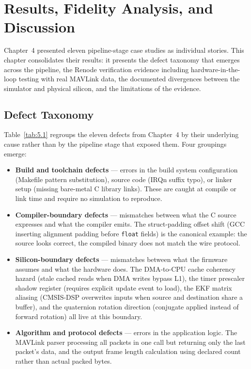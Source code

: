 \chapter{Results, Fidelity Analysis, and Discussion}
\label{ch:discussion}

Chapter~4 presented eleven pipeline-stage case studies as individual stories. This chapter consolidates their results: it presents the defect taxonomy that emerges across the pipeline, the Renode verification evidence including hardware-in-the-loop testing with real MAVLink data, the documented divergences between the simulator and physical silicon, and the limitations of the evidence.

\section{Defect Taxonomy}

Table~\ref{tab:5.1} regroups the eleven defects from Chapter~4 by their underlying cause rather than by the pipeline stage that exposed them. Four groupings emerge:

\begin{itemize}
\item \textbf{Build and toolchain defects} --- errors in the build system configuration (Makefile pattern substitution), source code (IRQn suffix typo), or linker setup (missing bare-metal C library links). These are caught at compile or link time and require no simulation to reproduce.
\item \textbf{Compiler-boundary defects} --- mismatches between what the C source expresses and what the compiler emits. The struct-padding offset shift (GCC inserting alignment padding before \texttt{float} fields) is the canonical example: the source looks correct, the compiled binary does not match the wire protocol.
\item \textbf{Silicon-boundary defects} --- mismatches between what the firmware assumes and what the hardware does. The DMA-to-CPU cache coherency hazard (stale cached reads when DMA writes bypass L1), the timer prescaler shadow register (requires explicit update event to load), the EKF matrix aliasing (CMSIS-DSP overwrites inputs when source and destination share a buffer), and the quaternion rotation direction (conjugate applied instead of forward rotation) all live at this boundary.
\item \textbf{Algorithm and protocol defects} --- errors in the application logic. The MAVLink parser processing all packets in one call but returning only the last packet's data, and the output frame length calculation using declared count rather than actual packed bytes.
\end{itemize}

